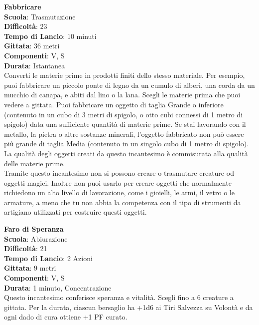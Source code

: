 \begin{multicols}{2}
\medskip\textbf{Fabbricare}\\
\textbf{Scuola}: Trasmutazione\\
\textbf{Difficoltà}: 23\\
\textbf{Tempo di Lancio}: 10 minuti\\
\textbf{Gittata}: 36 metri\\
\textbf{Componenti}: V, S\\
\textbf{Durata}: Istantanea\\
Converti le materie prime in prodotti finiti dello stesso materiale. Per esempio, puoi fabbricare un piccolo ponte di legno da un cumulo di alberi, una corda da un mucchio di canapa, e abiti dal lino o la lana. Scegli le materie prima che puoi vedere a gittata. Puoi fabbricare un oggetto di taglia Grande o inferiore (contenuto in un cubo di 3 metri di spigolo, o otto cubi connessi di 1 metro di spigolo) data una sufficiente quantità di materie prime. Se stai lavorando con il metallo, la pietra o altre sostanze minerali, l'oggetto fabbricato non può essere più grande di taglia Media (contenuto in un singolo cubo di 1 metro di spigolo). La qualità degli oggetti creati da questo incantesimo è commisurata alla qualità delle materie prime.\\
Tramite questo incantesimo non si possono creare o trasmutare creature od oggetti magici. Inoltre non puoi usarlo per creare oggetti che normalmente richiedono un alto livello di lavorazione, come i gioielli, le armi, il vetro o le armature, a meno che tu non abbia la competenza con il tipo di strumenti da artigiano utilizzati per costruire questi oggetti.

\medskip\textbf{Faro di Speranza}\\
\textbf{Scuola}: Abiurazione\\
\textbf{Difficoltà}: 21\\
\textbf{Tempo di Lancio}: 2 Azioni\\
\textbf{Gittata}: 9 metri\\
\textbf{Componenti}: V, S\\
\textbf{Durata}: 1 minuto, Concentrazione\\
Questo incantesimo conferisce speranza e vitalità. Scegli fino a 6 creature a gittata. Per la durata, ciascun bersaglio ha +1d6 ai Tiri Salvezza su Volontà e da ogni dado di cura ottiene +1 PF curato.


\end{multicols}
